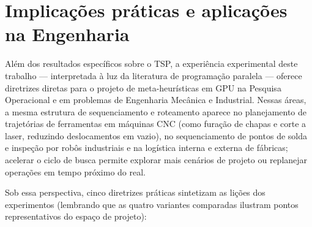 \section{Implicações práticas e aplicações na Engenharia}\label{sec-54-implicacoes-praticas}

Além dos resultados específicos sobre o TSP, a experiência experimental deste trabalho --- interpretada à luz da literatura de programação paralela \autocite{kirk2010programming,schulz2013gpu,oneil2015rethinking,nvidia2024cuda} --- oferece diretrizes diretas para o projeto de meta-heurísticas em GPU na Pesquisa Operacional e em problemas de Engenharia Mecânica e Industrial.
Nessas áreas, a mesma estrutura de sequenciamento e roteamento aparece no planejamento de trajetórias de ferramentas em máquinas CNC (como furação de chapas e corte a laser, reduzindo deslocamentos em vazio), no sequenciamento de pontos de solda e inspeção por robôs industriais e na logística interna e externa de fábricas; acelerar o ciclo de busca permite explorar mais cenários de projeto ou replanejar operações em tempo próximo do real.

Sob essa perspectiva, cinco diretrizes práticas sintetizam as lições dos experimentos (lembrando que as quatro variantes comparadas ilustram pontos representativos do espaço de projeto):

